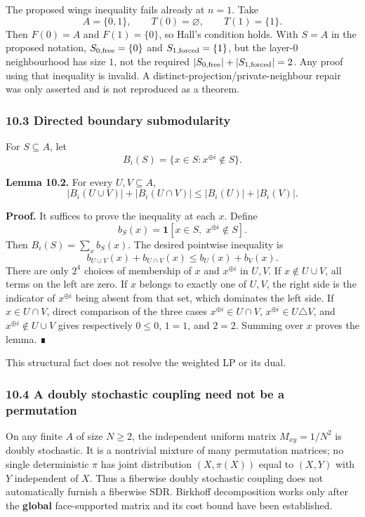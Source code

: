 The proposed wings inequality fails already at \(n=1\). Take
\[A=\{0,1\},\qquad T(0)=\varnothing,\qquad T(1)=\{1\}.\]
Then \(F(0)=A\) and \(F(1)=\{0\}\), so Hall's condition holds. With \(S=A\) in the proposed notation, \(S_{0,\rm free}=\{0\}\) and \(S_{1,\rm forced}=\{1\}\), but the layer-\(0\) neighbourhood has size \(1\), not the required \(|S_{0,\rm free}|+|S_{1,\rm forced}|=2\). Any proof using that inequality is invalid. A distinct-projection/private-neighbour repair was only asserted and is not reproduced as a theorem.

\subsubsection{10.3 Directed boundary submodularity}\label{directed-boundary-submodularity}

For \(S\subseteq A\), let
\[B_i(S)=\{x\in S:x^{\oplus i}\notin S\}.\]

\textbf{Lemma 10.2.} For every \(U,V\subseteq A\),
\[|B_i(U\cup V)|+|B_i(U\cap V)|\le|B_i(U)|+|B_i(V)|.\]

\textbf{Proof.} It suffices to prove the inequality at each \(x\). Define
\[b_S(x)=\mathbf1[x\in S,\;x^{\oplus i}\notin S].\]
Then \(B_i(S)=\sum_xb_S(x)\). The desired pointwise inequality is
\[b_{U\cup V}(x)+b_{U\cap V}(x)\le b_U(x)+b_V(x).\]
There are only \(2^4\) choices of membership of \(x\) and \(x^{\oplus i}\) in \(U,V\). If \(x\notin U\cup V\), all terms on the left are zero. If \(x\) belongs to exactly one of \(U,V\), the right side is the indicator of \(x^{\oplus i}\) being absent from that set, which dominates the left side. If \(x\in U\cap V\), direct comparison of the three cases \(x^{\oplus i}\in U\cap V\), \(x^{\oplus i}\in U\triangle V\), and \(x^{\oplus i}\notin U\cup V\) gives respectively \(0\le0\), \(1=1\), and \(2=2\). Summing over \(x\) proves the lemma. ∎

This structural fact does not resolve the weighted LP or its dual.

\subsubsection{10.4 A doubly stochastic coupling need not be a permutation}\label{a-doubly-stochastic-coupling-need-not-be-a-permutation}

On any finite \(A\) of size \(N\ge2\), the independent uniform matrix \(M_{xy}=1/N^2\) is doubly stochastic. It is a nontrivial mixture of many permutation matrices; no single deterministic \(\pi\) has joint distribution \((X,\pi(X))\) equal to \((X,Y)\) with \(Y\) independent of \(X\). Thus a fiberwise doubly stochastic coupling does not automatically furnish a fiberwise SDR. Birkhoff decomposition works only after the \textbf{global} face-supported matrix and its cost bound have been established.

